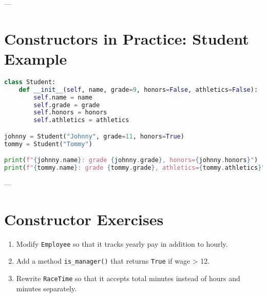 ---

\section*{Constructors in Practice: Student Example}

\begin{lstlisting}[language=Python, caption={Constructor with several defaults.}]
class Student:
    def __init__(self, name, grade=9, honors=False, athletics=False):
        self.name = name
        self.grade = grade
        self.honors = honors
        self.athletics = athletics

johnny = Student("Johnny", grade=11, honors=True)
tommy = Student("Tommy")

print(f"{johnny.name}: grade {johnny.grade}, honors={johnny.honors}")
print(f"{tommy.name}: grade {tommy.grade}, athletics={tommy.athletics}")
\end{lstlisting}

---

\section*{Constructor Exercises}

\begin{enumerate}
    \item Modify \texttt{Employee} so that it tracks yearly pay in addition to hourly.
    \item Add a method \texttt{is\_manager()} that returns \texttt{True} if wage > 12.
    \item Rewrite \texttt{RaceTime} so that it accepts total minutes instead of hours and minutes separately.
\end{enumerate}

